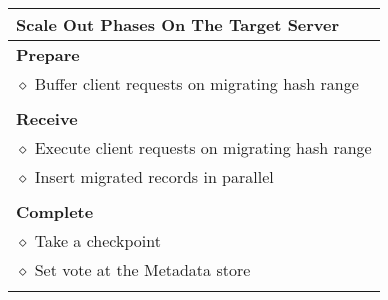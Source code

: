 \iffalse
\begin{table}[t]
\small
\begin{tabular}[]{p{}}
\toprule
\textbf{Scale Out Phases On The Target Server} \\
\midrule
\textbf{Prepare} \\
  \hspace{1em} $\diamond$ Buffer client requests on migrating hash range \\
  \\
\textbf{Receive} \\
  \hspace{1em} $\diamond$ Execute client requests on migrating hash range \\
  \hspace{1em} $\diamond$ Insert migrated records in parallel \\
  \\
\textbf{Complete} \\
  \hspace{1em} $\diamond$ Take a checkpoint \\
  \hspace{1em} $\diamond$ Set vote at the Metadata store \\
  \\
\bottomrule
\end{tabular}
\caption{}
\label{table:target}
\end{table}

